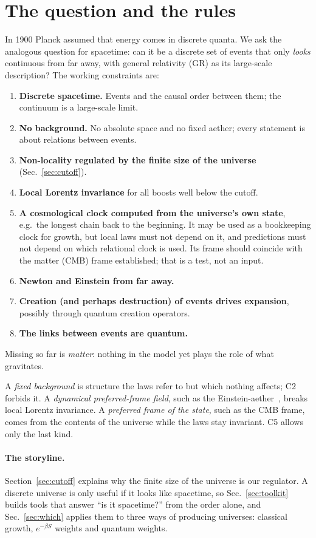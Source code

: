 \documentclass[11pt,a4paper]{article}
\newcommand{\tagbox}[2]{\textsf{\scriptsize\colorbox{#1!12}{\textcolor{#1!70!black}{#2}}}}
\newcommand{\est}{\tagbox{gray}{established}}
\begin{document}
\section{The question and the rules}
In 1900 Planck assumed that energy comes in discrete quanta. We ask the analogous question for spacetime: can it be a discrete set of events that only \emph{looks} continuous from far away, with general relativity (GR) as its large-scale description? The working constraints are:
\begin{enumerate}[label=\textbf{C\arabic*},leftmargin=*,itemsep=1pt]
\item \textbf{Discrete spacetime.} Events and the causal order between them; the continuum is a large-scale limit.
\item \textbf{No background.} No absolute space and no fixed aether; every statement is about relations between events.
\item \textbf{Non-locality regulated by the finite size of the universe} (Sec.~\ref{sec:cutoff}).
\item \textbf{Local Lorentz invariance} for all boosts well below the cutoff.
\item \textbf{A cosmological clock computed from the universe's own state}, e.g.\ the longest chain back to the beginning. It may be used as a bookkeeping clock for growth, but local laws must not depend on it, and predictions must not depend on which relational clock is used. Its frame should coincide with the matter (CMB) frame \est; that is a test, not an input.
\item \textbf{Newton and Einstein from far away.}
\item \textbf{Creation (and perhaps destruction) of events drives expansion}, possibly through quantum creation operators.
\item \textbf{The links between events are quantum.}
\end{enumerate}
Missing so far is \emph{matter}: nothing in the model yet plays the role of what gravitates.

A \emph{fixed background} is structure the laws refer to but which nothing affects; C2 forbids it. A \emph{dynamical preferred-frame field}, such as the Einstein-aether~\cite{JacobsonMattingly01}, breaks local Lorentz invariance. A \emph{preferred frame of the state}, such as the CMB frame, comes from the contents of the universe while the laws stay invariant. C5 allows only the last kind.

\paragraph{The storyline.} Section~\ref{sec:cutoff} explains why the finite size of the universe is our regulator. A discrete universe is only useful if it looks like spacetime, so Sec.~\ref{sec:toolkit} builds tools that answer ``is it spacetime?'' from the order alone, and Sec.~\ref{sec:which} applies them to three ways of producing universes: classical growth, $e^{-\beta S}$ weights and quantum weights.
\end{document}
